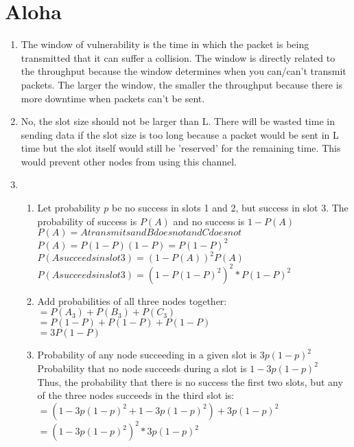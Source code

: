 \documentclass[11pt]{article}
\begin{document}
\section{Aloha}
\begin{enumerate}[label=(\alph*)]
\item {
	The window of vulnerability is the time in which the packet is being transmitted that it can suffer a collision. 
	The window is directly related to the throughput because the window determines when you can/can't transmit packets. 
	The larger the window, the smaller the throughput because there is more downtime when packets can't be sent.
}
\item {
	No, the slot size should not be larger than L. There will be wasted time in sending data if the slot size is too long because
	a packet would be sent in L time but the slot itself would still be 'reserved' for the remaining time. This would prevent other
	nodes from using this channel.
}
\item {
	\begin{enumerate}[label=(\Alph*)]
	\item {
		Let probability $p$ be no success in slots 1 and 2, but success in slot 3. The probability of success is $P(A)$ and no success is $1 - P(A)$ \\
		$P(A) = A transmits and B does not and C does not$ \\
		$P(A) = P(1 - P)(1 - P) = P(1 - P)^2$ \\
		$P(A succeeds in slot 3) = (1 - P(A))^2 P(A)$ \\
		$P(A succeeds in slot 3) = (1 - P(1 - P)^2)^2 * P(1 - P)^2$}
	\item {
		Add probabilities of all three nodes together: \\
		$= P(A_3) + P(B_3) + P(C_3)$ \\
	 	$= P(1 - P) + P(1 - P) + P(1 - P)$ \\
	 	$= 3P(1 - P)$
	} 
	\item {
		Probability of any node succeeding in a given slot is $3p(1 - p)^2$ \\
		Probability that no node succeeds during a slot is $1 - 3p(1 - p)^2$ \\
		
		Thus, the probability that there is no success the first two slots, but any of the three nodes succeeds in the third slot is: \\
		$= (1 - 3p(1 - p)^2 + 1 - 3p(1 - p)^2) + 3p(1 - p)^2$ \\
		$= (1 - 3p(1 - p)^2)^2 * 3p(1-p)^2 $
	}
	\end{enumerate}
}
\end{enumerate}
\end{document}
